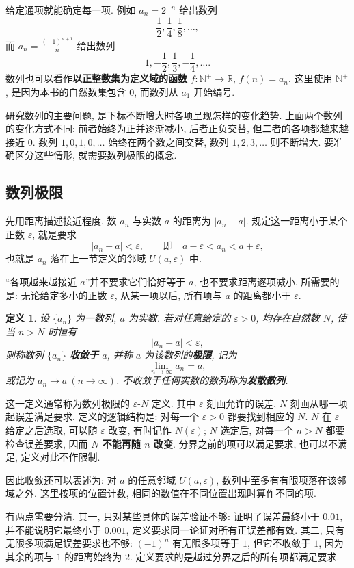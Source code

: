 \documentclass[UTF8,openany]{ctexbook}
\theoremstyle{chinesetextbook}
\newtheorem{definition}{定义}[section]
\begin{document}
给定通项就能确定每一项. 例如 $a_n=2^{-n}$ 给出数列
\[
\frac12,\frac14,\frac18,\ldots,
\]
而 $\displaystyle a_n=\frac{(-1)^{n+1}}{n}$ 给出数列
\[
1,-\frac12,\frac13,-\frac14,\ldots.
\]
数列也可以看作\textbf{以正整数集为定义域的函数} $f:\mathbb N^+\to\mathbb R$, $f(n)=a_n$. 这里使用 $\mathbb N^+$, 是因为本书的自然数集包含 $0$, 而数列从 $a_1$ 开始编号.

研究数列的主要问题, 是下标不断增大时各项呈现怎样的变化趋势. 上面两个数列的变化方式不同: 前者始终为正并逐渐减小, 后者正负交替, 但二者的各项都越来越接近 $0$. 数列 $1,0,1,0,\ldots$ 始终在两个数之间交替, 数列 $1,2,3,\ldots$ 则不断增大. 要准确区分这些情形, 就需要数列极限的概念.

\subsection{数列极限}

先用距离描述接近程度. 数 $a_n$ 与实数 $a$ 的距离为 $|a_n-a|$. 规定这一距离小于某个正数 $\varepsilon$, 就是要求
\[
|a_n-a|<\varepsilon,\qquad\text{即}\quad a-\varepsilon<a_n<a+\varepsilon,
\]
也就是 $a_n$ 落在上一节定义的邻域 $U(a,\varepsilon)$ 中.

“各项越来越接近 $a$”并不要求它们恰好等于 $a$, 也不要求距离逐项减小. 所需要的是: 无论给定多小的正数 $\varepsilon$, 从某一项以后, 所有项与 $a$ 的距离都小于 $\varepsilon$.

\begin{definition}
设 $\{a_n\}$ 为一数列, $a$ 为实数. 若对任意给定的 $\varepsilon>0$, 均存在自然数 $N$, 使当 $n>N$ 时恒有
\[
|a_n-a|<\varepsilon,
\]
则称数列 $\{a_n\}$ \textbf{收敛于} $a$, 并称 $a$ 为该数列的\textbf{极限}, 记为
\[
\lim_{n\to\infty}a_n=a,
\]
或记为 $a_n\to a\ (n\to\infty)$. 不收敛于任何实数的数列称为\textbf{发散数列}.
\end{definition}

这一定义通常称为数列极限的 $\varepsilon$-$N$ 定义. 其中 $\varepsilon$ 刻画允许的误差, $N$ 刻画从哪一项起误差满足要求. 定义的逻辑结构是: 对每一个 $\varepsilon>0$ 都要找到相应的 $N$. $N$ 在 $\varepsilon$ 给定之后选取, 可以随 $\varepsilon$ 改变, 有时记作 $N(\varepsilon)$; $N$ 选定后, 对每一个 $n>N$ 都要检查误差要求, 因而 \textbf{$N$ 不能再随 $n$ 改变}. 分界之前的项可以满足要求, 也可以不满足, 定义对此不作限制.

因此收敛还可以表述为: 对 $a$ 的任意邻域 $U(a,\varepsilon)$, 数列中至多有有限项落在该邻域之外. 这里按项的位置计数, 相同的数值在不同位置出现时算作不同的项.

有两点需要分清. 其一, 只对某些具体的误差验证不够: 证明了误差最终小于 $0.01$, 并不能说明它最终小于 $0.001$, 定义要求同一论证对所有正误差都有效. 其二, 只有无限多项满足误差要求也不够: $(-1)^n$ 有无限多项等于 $1$, 但它不收敛于 $1$, 因为其余的项与 $1$ 的距离始终为 $2$. 定义要求的是越过分界之后的所有项都满足要求.
\end{document}
